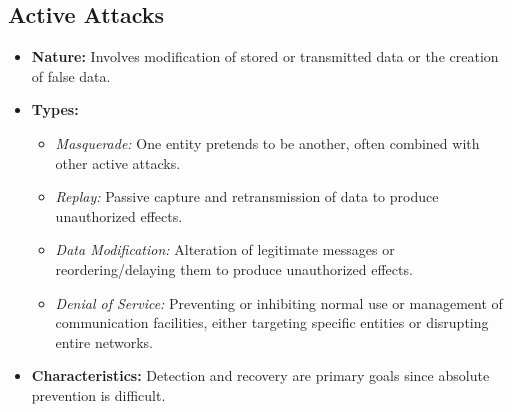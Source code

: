 \subsection{Active Attacks}
\begin{itemize}
    \item \textbf{Nature:} Involves modification of stored or transmitted data or the creation of false data.
    \item \textbf{Types:}
    \begin{itemize}
        \item \textit{Masquerade:} One entity pretends to be another, often combined with other active attacks.
        \item \textit{Replay:} Passive capture and retransmission of data to produce unauthorized effects.
        \item \textit{Data Modification:} Alteration of legitimate messages or reordering/delaying them to produce unauthorized effects.
        \item \textit{Denial of Service:} Preventing or inhibiting normal use or management of communication facilities, either targeting specific entities or disrupting entire networks.
    \end{itemize}
    \item \textbf{Characteristics:} Detection and recovery are primary goals since absolute prevention is difficult.
\end{itemize}

